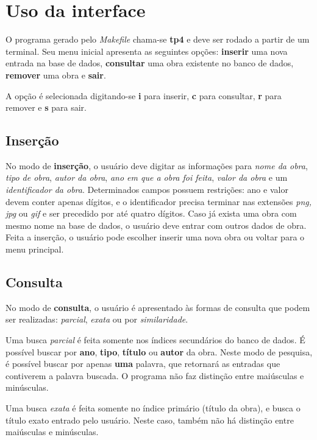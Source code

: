 \documentclass[a4paper,10pt]{article}
\begin{document}
\section{Uso da interface}
O programa gerado pelo \textit{Makefile} chama-se \textbf{tp4} e deve ser rodado a partir de um terminal. Seu menu inicial apresenta as seguintes opções: \textbf{inserir} uma nova entrada na base de dados, \textbf{consultar} uma obra existente no banco de dados, \textbf{remover} uma obra e \textbf{sair}.

A opção é selecionada digitando-se \textbf{i} para inserir, \textbf{c} para consultar, \textbf{r} para remover e \textbf{s} para sair.

\subsection{Inserção}
No modo de \textbf{inserção}, o usuário deve digitar as informações para \textit{nome da obra}, \textit{tipo de obra}, \textit{autor da obra}, \textit{ano em que a obra foi feita}, \textit{valor da obra} e um \textit{identificador da obra}. Determinados campos possuem restrições: ano e valor devem conter apenas dígitos, e o identificador precisa terminar nas extensões \textit{png, jpg} ou \textit{gif} e ser precedido por até quatro dígitos. Caso já exista uma obra com mesmo nome na base de dados, o usuário deve entrar com outros dados de obra. Feita a inserção, o usuário pode escolher inserir uma nova obra ou voltar para o menu principal.

\subsection{Consulta}
No modo de \textbf{consulta}, o usuário é apresentado às formas de consulta que podem ser realizadas: \textit{parcial}, \textit{exata} ou por \textit{similaridade}.

Uma busca \textit{parcial} é feita somente nos índices secundários do banco de dados. É possível buscar por \textbf{ano}, \textbf{tipo}, \textbf{título} ou \textbf{autor} da obra. Neste modo de pesquisa, é possível buscar por apenas \textbf{uma} palavra, que retornará as entradas que contiverem a palavra buscada. O programa não faz distinção entre maiúsculas e minúsculas.

Uma busca \textit{exata} é feita somente no índice primário (título da obra), e busca o título exato entrado pelo usuário. Neste caso, também não há distinção entre maiúsculas e minúsculas.
\end{document}
